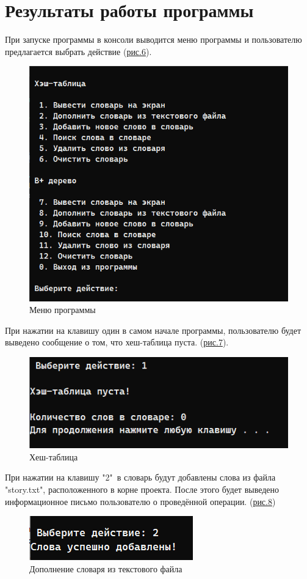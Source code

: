 \documentclass[11pt,a4paper,final]{article} %
\begin{document}
\newpage
\section{Результаты работы программы}
При запуске программы в консоли выводится меню программы и пользователю предлагается выбрать действие (\hyperref[fig:pic3]{рис.6}). \par

\begin{figure}[H]
	\centering
	\includegraphics[width=0.5\linewidth]{img/pic3.png}
	\caption{Меню программы}
	\label{fig:pic3}
\end{figure}

При нажатии на клавишу один в самом начале программы, пользователю будет выведено сообщение о том, что хеш-таблица пуста. (\hyperref[fig:pic4]{рис.7}). \par

\begin{figure}[H]
	\centering
	\includegraphics[width=0.5\linewidth]{img/pic4.png}
	\caption{Хеш-таблица}
	\label{fig:pic4}
\end{figure}


При нажатии на клавишу "2"\ в словарь будут добавлены слова из файла "story.txt", расположенного в корне проекта. После этого будет выведено информационное письмо пользователю о проведённой операции. (\hyperref[fig:pic5]{рис.8})

\begin{figure}[H]
	\centering
	\includegraphics[width=0.35\linewidth]{img/pic5.png}
	\caption{Дополнение словаря из текстового файла}
	\label{fig:pic5}
\end{figure}
\end{document}
